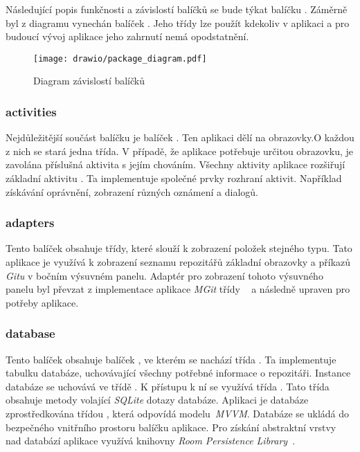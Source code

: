     Následující popis funkčnosti a závislostí balíčků se bude týkat balíčku . Záměrně byl z diagramu vynechán balíček . Jeho třídy lze použít kdekoliv v aplikaci a pro budoucí vývoj aplikace jeho zahrnutí nemá opodstatnění.

    \begin{figure}[h]
        \centering
        \vspace{0.5cm}
        \texttt{[image: drawio/package\_diagram.pdf]}
        \caption[Diagram závislostí balíčků]{Diagram závislostí balíčků}
        \label{diagram:packages}
    \end{figure}

    \newpage
    \subsubsection{activities}
    Nejdůležitější součást balíčku  je balíček . Ten aplikaci dělí na obrazovky.O každou z nich se stará jedna třída. V případě, že aplikace potřebuje určitou obrazovku, je zavolána příslušná aktivita s jejím chováním. Všechny aktivity aplikace rozšiřují základní aktivitu . Ta implementuje společné prvky rozhraní aktivit. Například získávání oprávnění, zobrazení různých oznámení a dialogů.

    \subsubsection{adapters}
    Tento balíček obsahuje třídy, které slouží k zobrazení položek stejného typu. Tato aplikace je využívá k zobrazení seznamu repozitářů základní obrazovky a příkazů \emph{Gitu} v bočním výsuvném panelu. Adaptér  pro zobrazení tohoto výsuvného panelu byl převzat z implementace aplikace \emph{MGit} třídy ~ a následně upraven pro potřeby aplikace.

    \subsubsection{database}
    Tento balíček obsahuje balíček , ve kterém se nachází třída . Ta implementuje tabulku databáze, uchovávající všechny potřebné informace o repozitáři. Instance databáze se uchovává ve třídě . K přístupu k ní se využívá třída . Tato třída obsahuje metody volající \emph{SQLite} dotazy databáze. Aplikaci je databáze zprostředkována třídou , která odpovídá  modelu~\emph{MVVM}. Databáze se ukládá do bezpečného vnitřního prostoru balíčku aplikace. Pro získání abstraktní vrstvy nad databází aplikace využívá knihovny \emph{Room Persistence Library}~.

